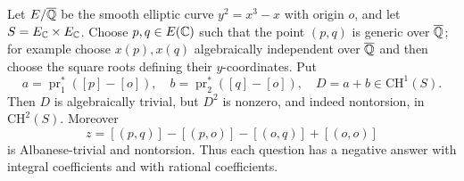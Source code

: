 \begin{theorem}\label{thm:B2-square}
Let $E/\overline{{\mathbb{Q}}}$ be the smooth elliptic curve
$y^2=x^3-x$ with origin $o$, and let $S=E_{\mathbb{C}}\times E_{\mathbb{C}}$.
Choose $p,q\in E({\mathbb{C}})$ such that the point $(p,q)$ is generic over
$\overline{{\mathbb{Q}}}$; for example choose $x(p),x(q)$ algebraically independent
over $\overline{{\mathbb{Q}}}$ and then choose the square roots defining their
$y$-coordinates. Put
\[
 a=\operatorname{pr}_1^*([p]-[o]),\quad
 b=\operatorname{pr}_2^*([q]-[o]),\quad
 D=a+b\in\mathrm{CH}^1(S).
\]
Then $D$ is algebraically trivial, but $D^2$ is nonzero, and indeed
nontorsion, in $\mathrm{CH}^2(S)$. Moreover
\[
 z=[(p,q)]-[(p,o)]-[(o,q)]+[(o,o)]
\]
is Albanese-trivial and nontorsion. Thus each question has a negative
answer with integral coefficients and with rational coefficients.
\end{theorem}
